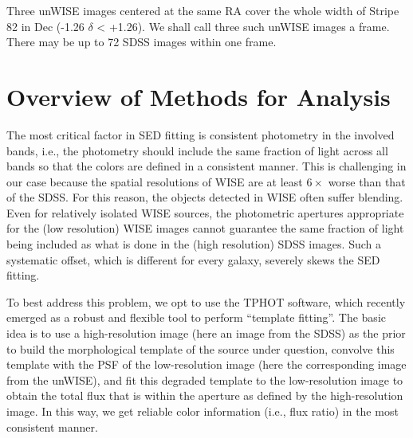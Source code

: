 \documentclass[numberedappendix,apj,twocolumn]{emulateapj}
\begin{document}
Three unWISE images centered at the same RA cover the whole width of Stripe 82 in Dec (-1.26 $\delta$ < +1.26). We shall call three such unWISE images a frame. There may be up to 72 SDSS images within one frame.

\section{Overview of Methods for Analysis}


The most critical factor in SED fitting is consistent photometry in the involved bands, i.e., the photometry should include the same fraction of light across all bands so that the colors are defined in a consistent manner. This is challenging in our case because the spatial resolutions of WISE are at least $6\times$ worse than that of the SDSS. For this reason, the objects detected in WISE often suffer blending. Even for relatively isolated WISE sources, the photometric apertures appropriate for the (low resolution) WISE images cannot guarantee the same fraction of light being included as what is done in the (high resolution) SDSS images. Such a systematic offset, which is different for every galaxy, severely skews the SED fitting. 

To best address this problem, we opt to use the TPHOT software, which recently emerged as a robust and flexible tool to perform ``template fitting''. The basic idea is to use a high-resolution image (here an image from the SDSS) as the prior to build the morphological template of the source under question, convolve this template with the PSF of the low-resolution image (here the corresponding image from the unWISE), and fit this degraded template to the low-resolution image to obtain the total flux that is within the aperture as defined by the high-resolution image. In this way, we get reliable color information (i.e., flux ratio) in the most consistent manner. 
\end{document}
